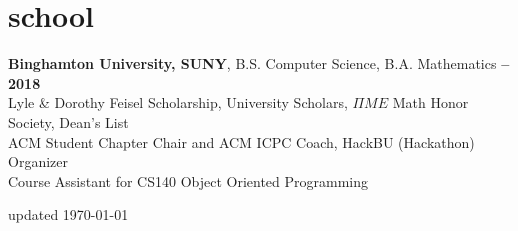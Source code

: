 \documentclass[margin,10pt]{res}
\begin{document}
\section{\sc \lsstyle school}
    \textbf{Binghamton University, SUNY}, B.S. Computer Science, B.A. Mathematics\hfill
    \textsc{\bfseries{} -- 2018}\\
    Lyle \& Dorothy Feisel Scholarship, University Scholars, $\Pi ME$ Math Honor Society, Dean's List\\
    ACM Student Chapter Chair and ACM ICPC Coach, HackBU (Hackathon) Organizer\\
    Course Assistant for CS140 Object Oriented Programming

\begin{minipage}[t]{\textwidth}
    \flushright
    \small
    \sc \lsstyle
    \hfill updated \today
\end{minipage}
\end{document}
